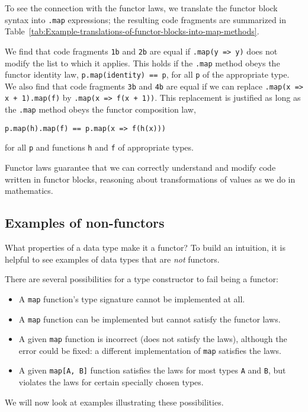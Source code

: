 To see the connection with the functor laws, we translate the functor
block syntax into \lstinline!.map! expressions; the resulting code
fragments are summarized in Table~\ref{tab:Example-translations-of-functor-blocks-into-map-methods}.

We find that code fragments \lstinline!1b! and \lstinline!2b! are
equal if \lstinline!.map(y => y)! does not modify the list to which
it applies. This holds if the \lstinline!.map! method obeys the functor
identity law, \lstinline!p.map(identity) == p!, for all \lstinline!p!
of the appropriate type. We also find that code fragments \lstinline!3b!
and \lstinline!4b! are equal if we can replace \lstinline!.map(x => x + 1).map(f)!
by \lstinline!.map(x => f(x + 1))!. This replacement is justified
as long as the \lstinline!.map! method obeys the functor composition
law, 
\begin{lstlisting}
p.map(h).map(f) == p.map(x => f(h(x)))
\end{lstlisting}
for all \lstinline!p! and functions \lstinline!h! and \lstinline!f!
of appropriate types.

Functor laws guarantee that we can correctly understand and modify
code written in functor blocks, reasoning about transformations of
values as we do in mathematics.

\subsection{Examples of non-functors\label{subsec:Examples-of-non-functors}}

What properties of a data type make it a functor? To build an intuition,
it is helpful to see examples of data types that are \emph{not} functors.

There are several possibilities for a type constructor to fail being
a functor:
\begin{itemize}
\item A \lstinline!map! function's type signature cannot be implemented
at all.
\item A \lstinline!map! function can be implemented but cannot satisfy
the functor laws.
\item A given \lstinline!map! function is incorrect (does not satisfy the
laws), although the error could be fixed: a different implementation
of \lstinline!map! satisfies the laws.
\item A given \lstinline!map[A, B]! function satisfies the laws for most
types \lstinline!A! and \lstinline!B!, but violates the laws for
certain specially chosen types.
\end{itemize}
We will now look at examples illustrating these possibilities.

